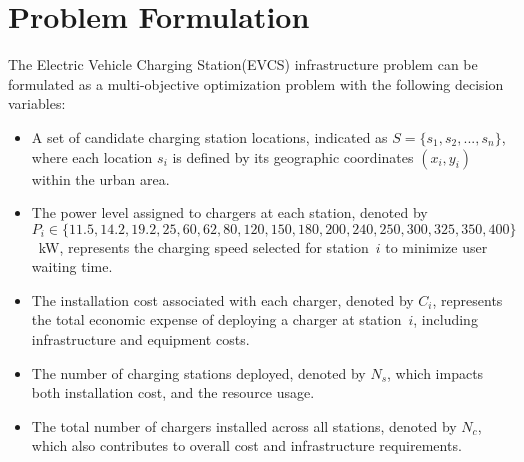 \section{Problem Formulation}
The Electric Vehicle Charging Station(EVCS) infrastructure problem can be formulated as a multi-objective optimization problem with the following decision variables:
\begin{itemize}
    \item A set of candidate charging station locations, indicated as $S = \{s_1, s_2, ..., s_n\}$, where each location $s_i$ is defined by its geographic coordinates $(x_i, y_i)$ within the urban area.

    \item The power level assigned to chargers at each station, denoted by $P_i \in \{11.5, 14.2, 19.2, 25, 60, 62, 80, 120, 150, 180, 200, 240, 250, 300, 325, 350, 400\}$~kW, represents the charging speed selected for station~$i$ to minimize user waiting time.

    \item The installation cost associated with each charger, denoted by $C_i$, represents the total economic expense of deploying a charger at station~$i$, including infrastructure and equipment costs.

    \item The number of charging stations deployed, denoted by $N_s$, which impacts both installation cost, and the resource usage.

    \item The total number of chargers installed across all stations, denoted by $N_c$, which also contributes to overall cost and infrastructure requirements.
\end{itemize}


